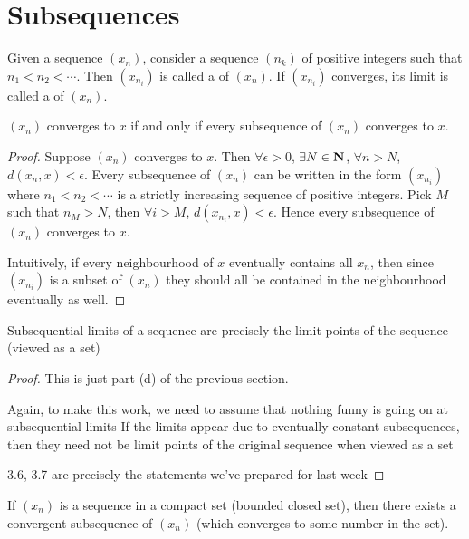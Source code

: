 \section{Subsequences}
\begin{definition}[Subsequence]
Given a sequence $(x_n)$, consider a sequence $(n_k)$ of positive integers such that $n_1<n_2<\cdots$. Then $(x_{n_i})$ is called a  of $(x_n)$. If $(x_{n_i})$ converges, its limit is called a  of $(x_n)$.
\end{definition}

\begin{proposition}
$(x_n)$ converges to $x$ if and only if every subsequence of $(x_n)$ converges to $x$.
\end{proposition}

\begin{proof}
Suppose $(x_n)$ converges to $x$. Then $\forall\epsilon>0$, $\exists N\in\mathbf N$, $\forall n>N$, $d(x_n,x)<\epsilon$. Every subsequence of $(x_n)$ can be written in the form $(x_{n_i})$ where $n_1<n_2<\cdots$ is a strictly increasing sequence of positive integers. Pick $M$ such that $n_M>N$, then $\forall i>M$, $d(x_{n_i},x)<\epsilon$. Hence every subsequence of $(x_n)$ converges to $x$.

Intuitively, if every neighbourhood of $x$ eventually contains all $x_n$, then since $(x_{n_i})$ is a subset of $(x_n)$ they should all be contained in the neighbourhood eventually as well.
\end{proof}

\begin{proposition}
Subsequential limits of a sequence are precisely the limit points of the sequence (viewed as a set)
\end{proposition}

\begin{proof}
This is just part (d) of the previous section.

Again, to make this work, we need to assume that nothing funny is going on at subsequential limits
If the limits appear due to eventually constant subsequences, then they need not be limit points of the original sequence when viewed as a set

3.6, 3.7 are precisely the statements we've prepared for last week
\end{proof}

\begin{proposition}
If $(x_n)$ is a sequence in a compact set (bounded closed set), then there exists a convergent subsequence of $(x_n)$ (which converges to some number in the set).
\end{proposition}

